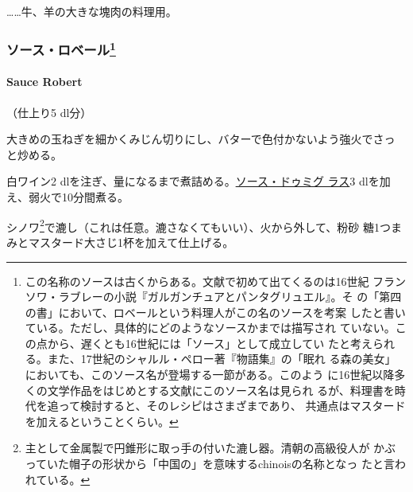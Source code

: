 \begin{recette}
\ldots{}\ldots{}牛、羊の大きな塊肉の料理用。

\maeaki

\hypertarget{ux30bdux30fcux30b9ux30edux30d9ux30fcux30eb77}{%
\subsubsection[ソース・ロベール]{\texorpdfstring{ソース・ロベール\footnote{この名称のソースは古くからある。文献で初めて出てくるのは16世紀
  フランソワ・ラブレーの小説『ガルガンチュアとパンタグリュエル』。そ
  の「第四の書」において、ロベールという料理人がこの名のソースを考案
  したと書いている。ただし、具体的にどのようなソースかまでは描写され
  ていない。この点から、遅くとも16世紀には「ソース」として成立してい
  たと考えられる。また、17世紀のシャルル・ペロー著『物語集』の「眠れ
  る森の美女」においても、このソース名が登場する一節がある。このよう
  に16世紀以降多くの文学作品をはじめとする文献にこのソース名は見られ
  るが、料理書を時代を追って検討すると、そのレシピはさまざまであり、
  共通点はマスタードを加えるということくらい。}}{ソース・ロベール}}\label{ux30bdux30fcux30b9ux30edux30d9ux30fcux30eb77}}

\hypertarget{sauce-robert}{%
\paragraph{Sauce Robert}\label{sauce-robert}}

  

（仕上り5 dl分）

大きめの玉ねぎを細かくみじん切りにし、バターで色付かないよう強火でさっ
と炒める。

白ワイン2
dlを注ぎ、\untiers{}量になるまで煮詰める。\protect\hyperlink{sauce-demi-glace}{ソース・ドゥミグ
ラス}3 dlを加え、弱火で10分間煮る。

シノワ\footnote{主として金属製で円錐形に取っ手の付いた漉し器。清朝の高級役人が
  かぶっていた帽子の形状から「中国の」を意味するchinoisの名称となっ
  たと言われている。}で漉し（これは任意。漉さなくてもいい）、火から外して、粉砂
糖1つまみとマスタード大さじ1杯を加えて仕上げる。

\maeaki

\hypertarget{ux30bdux30fcux30b9ux30edux30d9ux30fcux30ebux30a8ux30b9ux30b3ux30d5ux30a3ux30a879}{%
}
\end{recette}
